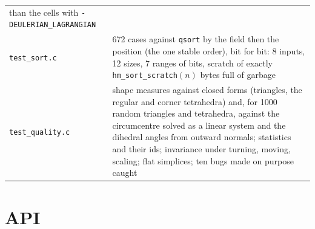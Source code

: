 \documentclass[10pt,a4paper]{article}
\theoremstyle{definition}
\newcommand{\fn}[1]{\texttt{#1}}
\begin{document}
\begin{center}
\begin{tabularx}{\textwidth}{@{}>{\raggedright}p{}X@{}}
    than the cells with \fn{-DEULERIAN\_LAGRANGIAN} \\
  \fn{test\_sort.c} & 672 cases against \fn{qsort} by the field then the
    position (the one stable order), bit for bit: 8 inputs, 12 sizes, 7
    ranges of bits, scratch of exactly \fn{hm\_sort\_scratch}$(n)$ bytes full
    of garbage \\
  \fn{test\_quality.c} & shape measures against closed forms (triangles,
    the regular and corner tetrahedra) and, for 1000 random triangles and
    tetrahedra, against the circumcentre solved as a linear system and the
    dihedral angles from outward normals; statistics and their ids;
    invariance under turning, moving, scaling; flat simplices; ten bugs
    made on purpose caught \\
  \bottomrule
\end{tabularx}
\end{center}

\section{API}
\label{sec:api}
\end{document}
